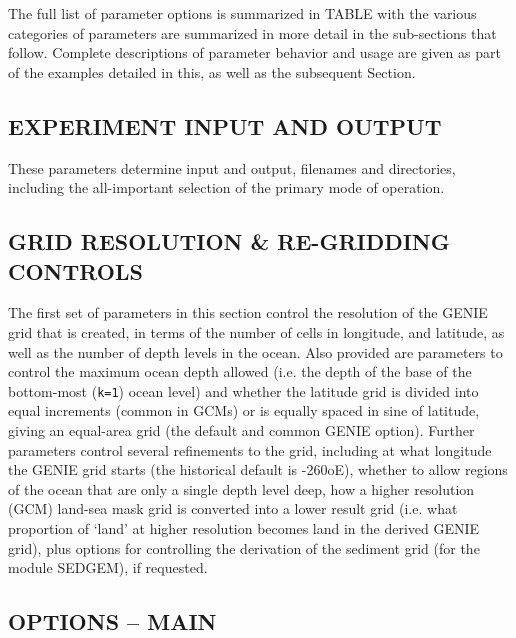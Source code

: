 \documentclass[11pt,fleqn]{book} %
\begin{document}
The full list of parameter options is summarized in TABLE with the various categories of parameters are summarized in more detail in the sub-sections that follow. Complete descriptions of parameter behavior and usage are given as part of the examples detailed in this, as well as the subsequent Section.


\subsection{EXPERIMENT INPUT AND OUTPUT}

These parameters determine input and output, filenames and directories, including the all-important selection of the primary mode of operation.


\subsection{GRID RESOLUTION \& RE-GRIDDING CONTROLS}

The first set of parameters in this section control the resolution of the GENIE grid that is created, in terms of the number of cells in longitude, and latitude, as well as the number of depth levels in the ocean. Also provided are parameters to control the maximum ocean depth allowed (i.e. the depth of the base of the bottom-most (\texttt{k=1}) ocean level) and whether the latitude grid is divided into equal increments (common in GCMs) or is equally spaced in sine of latitude, giving an equal-area grid (the default and common GENIE option). Further parameters control several refinements to the grid, including at what longitude the GENIE grid starts (the historical default is -260oE), whether to allow regions of the ocean that are only a single depth level deep, how a higher resolution (GCM) land-sea mask grid is converted into a lower result grid (i.e. what proportion of `land' at higher resolution becomes land in the derived GENIE grid), plus options for controlling the derivation of the sediment grid (for the module SEDGEM), if requested.


\subsection{OPTIONS -- MAIN}
\end{document}

